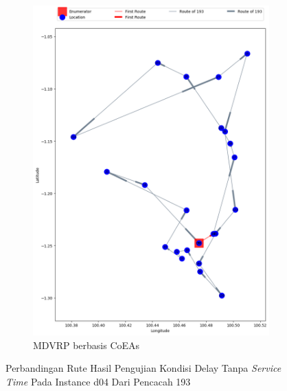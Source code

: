 \begin{figure}[H]
	\centering
	\begin{subfigure}[t]{\textwidth}
		\centering
		\includegraphics[width=\textwidth]{Resources/Images/delayed_4/real_m15_n100_delayed_4_193_coes}
		\caption{MDVRP berbasis CoEAs}
		\label{fig:real_m15_n100_delayed_4_193_coes}
	\end{subfigure}
	\caption{Perbandingan Rute Hasil Pengujian Kondisi Delay Tanpa \textit{Service Time} Pada Instance d04 Dari Pencacah 193}
	\label{fig:real_m15_n100_delayed_4_193}
\end{figure}


